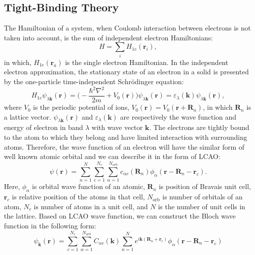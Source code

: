 \documentclass[12pt,english,a4paper]{article}
\begin{document}
	\subsection{Tight-Binding Theory}
\quad The Hamiltonian of a system, when Coulomb interaction between electrons is not taken into account, is the sum of independent electron Hamiltonians:
	\begin{equation}
		H =\sum_{i} H_{1e} (\textbf{r}_i),
	\end{equation}
in which, $H_{1e} (\textbf{r}_a)$ is the single electron Hamiltonian. In the independent electron approximation, the stationary state of an electron in a solid is presented by the one-particle time-independent Schrödinger equation:
	\begin{equation}
		\label{one-particle time-independent Schrödinger equation}
		H_{1e} \psi_{\lambda\textbf{k}}( \textbf{r}) = \bigg(-\frac{\hbar^2 \nabla^2}{2m} + V_0 (\textbf{r})\bigg) \psi_{\lambda \textbf{k}}(\textbf{r}) = \varepsilon_{\lambda}(\textbf{k})\psi_{\lambda \textbf{k}}(\textbf{r}),
	\end{equation}
\quad where $V_0$ is the periodic potential of ions, $
V_0(\textbf{r}) = V_0 (\textbf{r}+\textbf{R}_n)$, in which $\textbf{R}_n$ is a lattice vector. $\psi_{\lambda\textbf{k}}(\textbf{r})$ and $\varepsilon_{\lambda}(\textbf{k})$ are respectively the wave function and energy of electron in band $\lambda$ with wave vector $\textbf{k}$. The electrons are tightly bound to the atom to which they belong and have limited interaction with surrounding atoms. Therefore, the wave function of an electron will have the similar form of well known atomic orbital and we can describe it in the form of \ac{LCAO}:
	\begin{equation}
		\psi(\textbf{r}) = \sum_{n=1}^N \sum_{c=1}^{N_c}\sum_{\alpha = 1}^{N_{orb}}c_{\alpha c}(\textbf{R}_n) \phi_\alpha(\textbf{r} -\textbf{R}_n- \textbf{r}_c).
	\end{equation}
\quad Here, $\phi_\alpha$ is orbital wave function of an atomic, $\textbf{R}_n$ is position of Bravais unit cell, $\textbf{r}_c$ is relative position of the atoms in that cell, $N_{\mathrm{orb}}$ is number of orbitals of an atom, $N_c$ is number of atoms in a unit cell, and $N$ is the number of unit cells in the lattice. Based on LCAO wave function, we can construct the Bloch wave function in the following form:
	\begin{equation}
		\label{Bloch TB}
		\psi_{\textbf{k}} (\textbf{r}) = \sum_{c=1}^{N_c} \sum_{\alpha = 1}^{N_{orb}} C_{\alpha c} (\textbf{k}) \sum_{n=1}^N e^{i\textbf{k}(\textbf{R}_n +\textbf{r}_c)} \phi_{\alpha}(\textbf{r} -\textbf{R}_n -\textbf{r}_c)
	\end{equation}
\end{document}
